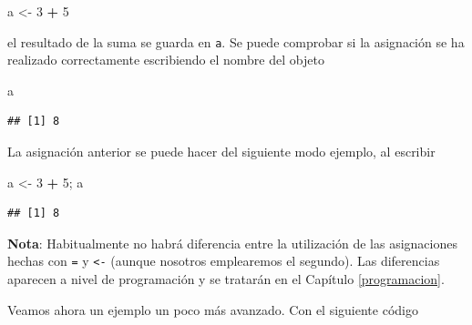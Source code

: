 \documentclass[]{book}
\newenvironment{Shaded}{\begin{snugshade}}{\end{snugshade}}
\newcommand{\DecValTok}[1]{\textcolor[rgb]{0.00,0.00,0.81}{#1}}
\newcommand{\NormalTok}[1]{#1}
\newcommand{\OperatorTok}[1]{\textcolor[rgb]{0.81,0.36,0.00}{\textbf{#1}}}
\newcommand{\StringTok}[1]{\textcolor[rgb]{0.31,0.60,0.02}{#1}}
\begin{document}
\begin{Shaded}
\begin{Highlighting}[]
\NormalTok{a <-}\StringTok{ }\DecValTok{3} \OperatorTok{+}\StringTok{ }\DecValTok{5}
\end{Highlighting}
\end{Shaded}

el resultado de la suma se guarda en \texttt{a}. Se puede comprobar si la
asignación se ha realizado correctamente escribiendo el nombre del
objeto

\begin{Shaded}
\begin{Highlighting}[]
\NormalTok{a}
\end{Highlighting}
\end{Shaded}

\begin{verbatim}
## [1] 8
\end{verbatim}

La asignación anterior se puede hacer del siguiente modo
ejemplo, al escribir

\begin{Shaded}
\begin{Highlighting}[]
\NormalTok{a <-}\StringTok{ }\DecValTok{3} \OperatorTok{+}\StringTok{ }\DecValTok{5}\NormalTok{; a}
\end{Highlighting}
\end{Shaded}

\begin{verbatim}
## [1] 8
\end{verbatim}

\textbf{Nota}: Habitualmente no habrá diferencia entre la utilización de las
asignaciones hechas con \texttt{=} y \texttt{\textless{}-} (aunque nosotros emplearemos el segundo).
Las diferencias aparecen a nivel
de programación y se tratarán en el Capítulo \ref{programacion}.

Veamos ahora un ejemplo un poco más avanzado. Con el
siguiente código
\end{document}
